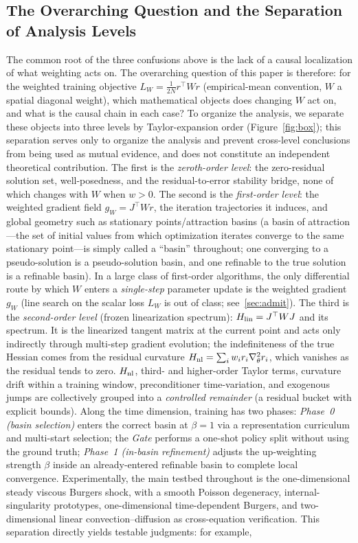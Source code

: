 \documentclass[11pt]{article}
\newcommand{\W}{W}
\numberwithin{equation}{section}
\begin{document}
\subsection{The Overarching Question and the Separation of Analysis Levels}\label{sec:q}
The common root of the three confusions above is the lack of a causal localization of what weighting acts on. The overarching question of this paper is therefore: for the weighted training objective $L_{\W}=\tfrac{1}{2N} r^\top \W r$ (empirical-mean convention, $\W$ a spatial diagonal weight), which mathematical objects does changing $\W$ act on, and what is the causal chain in each case? To organize the analysis, we separate these objects into three levels by Taylor-expansion order (Figure~\ref{fig:box}); this separation serves only to organize the analysis and prevent cross-level conclusions from being used as mutual evidence, and does not constitute an independent theoretical contribution. The first is the \emph{zeroth-order level}: the zero-residual solution set, well-posedness, and the residual-to-error stability bridge, none of which changes with $\W$ when $w>0$. The second is the \emph{first-order level}: the weighted gradient field $g_{\W}=J^\top\W r$, the iteration trajectories it induces, and global geometry such as stationary points/attraction basins (a basin of attraction---the set of initial values from which optimization iterates converge to the same stationary point---is simply called a ``basin'' throughout; one converging to a pseudo-solution is a pseudo-solution basin, and one refinable to the true solution is a refinable basin). In a large class of first-order algorithms, the only differential route by which $\W$ enters a \emph{single-step} parameter update is the weighted gradient $g_{\W}$ (line search on the scalar loss $L_\W$ is out of class; see~\ref{sec:admit}). The third is the \emph{second-order level} (frozen linearization spectrum): $H_{\rm lin}=J^\top\W J$ and its spectrum. It is the linearized tangent matrix at the current point and acts only indirectly through multi-step gradient evolution; the indefiniteness of the true Hessian comes from the residual curvature $H_{\rm nl}=\sum_i w_i r_i\nabla_\theta^2 r_i$, which vanishes as the residual tends to zero. $H_{\rm nl}$, third- and higher-order Taylor terms, curvature drift within a training window, preconditioner time-variation, and exogenous jumps are collectively grouped into a \emph{controlled remainder} (a residual bucket with explicit bounds). Along the time dimension, training has two phases: \emph{Phase~0 (basin selection)} enters the correct basin at $\beta=1$ via a representation curriculum and multi-start selection; the \emph{Gate} performs a one-shot policy split without using the ground truth; \emph{Phase~1 (in-basin refinement)} adjusts the up-weighting strength $\beta$ inside an already-entered refinable basin to complete local convergence. Experimentally, the main testbed throughout is the one-dimensional steady viscous Burgers shock, with a smooth Poisson degeneracy, internal-singularity prototypes, one-dimensional time-dependent Burgers, and two-dimensional linear convection--diffusion as cross-equation verification. This separation directly yields testable judgments: for example, 
\end{document}
